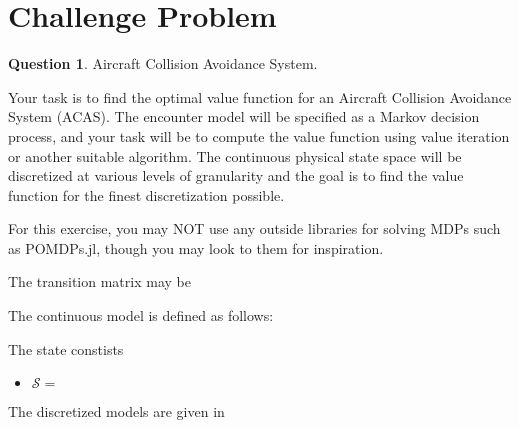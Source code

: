\documentclass{article}
\theoremstyle{definition}
\newtheorem{question}[thm]{Question}
\begin{document}
\section{Challenge Problem}

\begin{question}
Aircraft Collision Avoidance System.

Your task is to find the optimal value function for an Aircraft Collision Avoidance System (ACAS). The encounter model will be specified as a Markov decision process, and your task will be to compute the value function using value iteration or another suitable algorithm. The continuous physical state space will be discretized at various levels of granularity and the goal is to find the value function for the finest discretization possible.

For this exercise, you may NOT use any outside libraries for solving MDPs such as POMDPs.jl, though you may look to them for inspiration.

The transition matrix may be

The continuous model is defined as follows:

The state constists 
\begin{itemize}
    \item $\mathcal{S} = $
\end{itemize}

The discretized models are given in 

\end{question}
\end{document}
